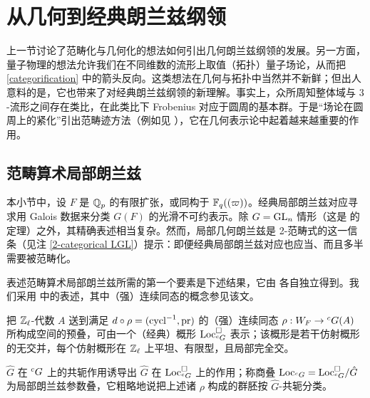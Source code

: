 
\section{从几何到经典朗兰兹纲领}

上一节讨论了范畴化与几何化的想法如何引出几何朗兰兹纲领的发展。另一方面，量子物理的想法允许我们在不同维数的流形上取值（拓扑）量子场论，从而把 \eqref{categorification} 中的箭头反向。这类想法在几何与拓扑中当然并不新鲜；但出人意料的是，它也带来了对经典朗兰兹纲领的新理解。事实上，众所周知整体域与 $3$-流形之间存在类比，在此类比下 Frobenius 对应于圆周的基本群。于是“场论在圆周上的紧化”引出范畴迹方法（例如见 \cite{AGKRRV, BCHN, Zhu-CDM}），它在几何表示论中起着越来越重要的作用。

\subsection{范畴算术局部朗兰兹}\label{S: Local Langlands}

本小节中，设 $F$ 是 ${\mathbb Q}_p$ 的有限扩张，或同构于 ${\mathbb F}_q((\varpi))$。经典局部朗兰兹对应寻求用 Galois 数据来分类 $G(F)$ 的光滑不可约表示。除 $G={\operatorname{GL}}_n$ 情形（这是 \cite{LRS-GLn, Harris-Taylor-GLn} 的定理）之外，其精确表述相当复杂。然而，局部几何朗兰兹是 2-范畴式的这一信条（见注 \ref{2-categorical LGL}）提示：即便经典局部朗兰兹对应也应当、而且多半需要被范畴化。

表述范畴算术局部朗兰兹所需的第一个要素是下述结果，它由 \cite{DHKM, Fargues-Scholze-Geometrization, Zhu-Conjecture} 各自独立得到。我们采用 \cite{Zhu-Conjecture} 中的表述，其中（强）连续同态的概念参见该文。

\begin{thm}\label{Stack of local parameters}
把 ${\mathbb Z}_\ell$-代数 $A$ 送到满足 $d\circ\rho=({\operatorname{cycl}}^{-1},{\operatorname{pr}})$ 的（强）连续同态 $\rho: W_F\to {}^cG(A)$ 所构成空间的预叠，可由一个（经典）概形 ${\operatorname{Loc}}_{{}^cG}^\Box$ 表示；该概形是若干仿射概形的无交并，每个仿射概形在 ${\mathbb Z}_\ell$ 上平坦、有限型，且局部完全交。
\end{thm}

$\hat{G}$ 在 ${}^cG$ 上的共轭作用诱导出 $\hat{G}$ 在 ${\operatorname{Loc}}_{{}^cG}^\Box$ 上的作用；称商叠 ${\operatorname{Loc}}_{{}^cG}={\operatorname{Loc}}_{{}^cG}^\Box/\hat{G}$ 为局部朗兰兹参数叠，它粗略地说把上述诸 $\rho$ 构成的群胚按 $\hat{G}$-共轭分类。

